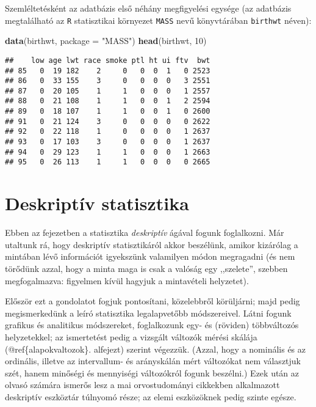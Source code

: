 \documentclass[]{book}
\newenvironment{Shaded}{\begin{snugshade}}{\end{snugshade}}
\newcommand{\KeywordTok}[1]{\textcolor[rgb]{0.13,0.29,0.53}{\textbf{#1}}}
\newcommand{\DataTypeTok}[1]{\textcolor[rgb]{0.13,0.29,0.53}{#1}}
\newcommand{\DecValTok}[1]{\textcolor[rgb]{0.00,0.00,0.81}{#1}}
\newcommand{\StringTok}[1]{\textcolor[rgb]{0.31,0.60,0.02}{#1}}
\newcommand{\NormalTok}[1]{#1}
\begin{document}
Szemléltetésként az adatbázis első néhány megfigyelési egysége (az
adatbázis megtalálható az \texttt{R} statisztikai környezet
\texttt{MASS} nevű könyvtárában \texttt{birthwt} néven):

\begin{Shaded}
\begin{Highlighting}[]
\KeywordTok{data}\NormalTok{(birthwt, }\DataTypeTok{package =} \StringTok{"MASS"}\NormalTok{)}
\KeywordTok{head}\NormalTok{(birthwt, }\DecValTok{10}\NormalTok{)}
\end{Highlighting}
\end{Shaded}

\begin{verbatim}
##    low age lwt race smoke ptl ht ui ftv  bwt
## 85   0  19 182    2     0   0  0  1   0 2523
## 86   0  33 155    3     0   0  0  0   3 2551
## 87   0  20 105    1     1   0  0  0   1 2557
## 88   0  21 108    1     1   0  0  1   2 2594
## 89   0  18 107    1     1   0  0  1   0 2600
## 91   0  21 124    3     0   0  0  0   0 2622
## 92   0  22 118    1     0   0  0  0   1 2637
## 93   0  17 103    3     0   0  0  0   1 2637
## 94   0  29 123    1     1   0  0  0   1 2663
## 95   0  26 113    1     1   0  0  0   0 2665
\end{verbatim}

\chapter{Deskriptív statisztika}\label{deskriptiv}

Ebben az fejezetben a statisztika \emph{deskriptív} ágával fogunk
foglalkozni. Már utaltunk rá, hogy deskriptív statisztikáról akkor
beszélünk, amikor kizárólag a mintában lévő információt igyekszünk
valamilyen módon megragadni (és nem törődünk azzal, hogy a minta maga is
csak a valóság egy ,,szelete'', szebben megfogalmazva: figyelmen kívül
hagyjuk a mintavételi helyzetet).

Először ezt a gondolatot fogjuk pontosítani, közelebbről körüljárni;
majd pedig megismerkedünk a leíró statisztika legalapvetőbb
módszereivel. Látni fogunk grafikus és analitikus módszereket,
foglalkozunk egy- és (röviden) többváltozós helyzetekkel; az ismertetést
pedig a vizsgált változók mérési skálája (@ref\{alapokvaltozok\}.
alfejezt) szerint végezzük. (Azzal, hogy a nominális és az ordinális,
illetve az intervallum- és arányskálán mért változókat nem választjuk
szét, hanem minőségi és mennyiségi változókról fogunk beszélni.) Ezek
után az olvasó számára ismerős lesz a mai orvostudományi cikkekben
alkalmazott deskriptív eszköztár túlnyomó része; az elemi eszközöknek
pedig szinte egésze.
\end{document}
